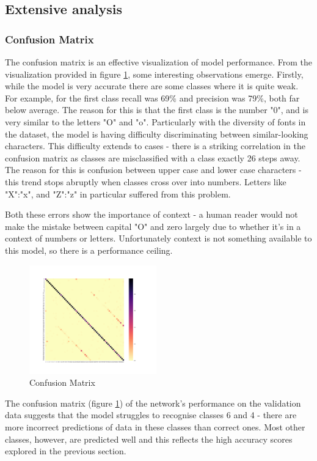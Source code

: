 \documentclass[fleqn,10pt]{SelfArx} %
\begin{document}
\subsection{Extensive analysis}

\subsubsection{Confusion Matrix}
The confusion matrix is an effective visualization of model performance. From the visualization provided in figure \ref{fig:confusion_matrix}, some interesting observations emerge. Firstly, while the model is very accurate there are some classes where it is quite weak. For example, for the first class recall was 69\% and precision was 79\%, both far below average. The reason for this is that the first class is the number "0", and is very similar to the letters "O" and "o". Particularly with the diversity of fonts in the dataset, the model is having difficulty discriminating between similar-looking characters. This difficulty extends to cases - there is a striking correlation in the confusion matrix as classes are misclassified with a class exactly 26 steps away. The reason for this is confusion between upper case and lower case characters - this trend stops abruptly when classes cross over into numbers. Letters like "X":"x", and "Z":"z" in particular suffered from this problem.

Both these errors show the importance of context - a human reader would not make the mistake between capital "O" and zero largely due to whether it's in a context of numbers or letters. Unfortunately context is not something available to this model, so there is a performance ceiling.\begin{figure}[ht]\centering
\includegraphics[width=0.49\textwidth]{confusion_matrix}
\caption{Confusion Matrix}
\label{fig:confusion_matrix}
\end{figure}
The confusion matrix (figure \ref{fig:confusion_matrix}) of the network's performance on the validation data suggests that the model struggles to recognise classes 6 and 4 - there are more incorrect predictions of data in these classes than correct ones. Most other classes, however, are predicted well and this reflects the high accuracy scores explored in the previous section.
\end{document}
